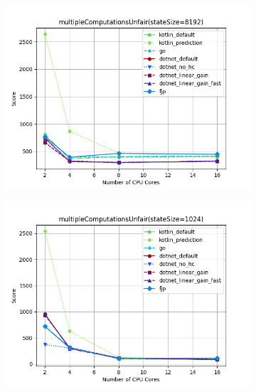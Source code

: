 \documentclass{article}
\begin{document}
\begin{figure}[H]
    \begin{subfigure}[b]{0.48\textwidth}
        \includegraphics[width=\linewidth]{plots/multipleComputationsUnfair(stateSize=8192)_with_legend.png}
    \end{subfigure}
    \begin{subfigure}[b]{0.48\textwidth}
        \includegraphics[width=\linewidth]{plots/multipleComputationsUnfair(stateSize=1024)_with_legend.png}
    \end{subfigure}

    \vspace{1em}


\end{figure}
\end{document}

